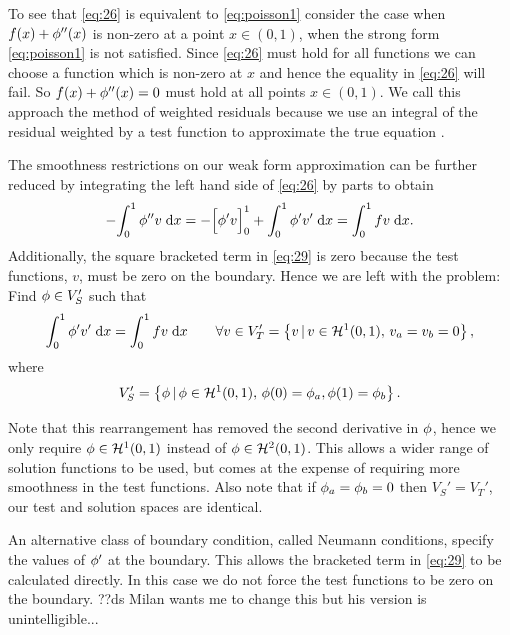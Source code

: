 To see that \cref{eq:26} is equivalent to \cref{eq:poisson1} consider the case when $f(x) + \phi''(x)$ is non-zero at a point $x \in (0,1)$, \ie when the strong form \cref{eq:poisson1} is not satisfied. 
Since \cref{eq:26} must hold for all functions we can choose a function which is non-zero at $x$ and hence the equality in \cref{eq:26} will fail.
So $f(x) + \phi''(x) = 0$ must hold at all points $x \in (0,1)$.
We call this approach the method of weighted residuals because we use an integral of the residual weighted by a test function to approximate the true equation \cite[210, 214]{Zeinkiewicz1967}.

The smoothness restrictions on our weak form approximation can be further reduced by integrating the left hand side of \cref{eq:26} by parts to obtain
\begin{equation}
  -{\int_0^1  \phi''v  {\; \mathrm{{d}}}{x}} = -\Big[ \phi'v \Big]_{0}^{1} + {\int_0^1  \phi'v'  {\; \mathrm{{d}}}{x}} = {\int_0^1 f v {\; \mathrm{{d}}}{x}}.
  \label{eq:29}
\end{equation}
Additionally, the square bracketed term in \cref{eq:29} is zero because the test functions, $v$, must be zero on the boundary.
Hence we are left with the problem: Find $\phi \in V'_{S}$ such that
\begin{equation}
  {\int_0^1  \phi'v'  {\; \mathrm{{d}}}{x}} = {\int_0^1  fv  {\; \mathrm{{d}}}{x}} \qquad 
  \forall v \in V'_{T} = \left\{ {v \,|\, v \in \mathcal{H}^1(0,1),\, v_a=v_b=0} \right\},
  \label{eq:symmetric-weak-poisson}
\end{equation}
where
\begin{equation}
  V_{S}'=\left\{ {\phi \,|\, \phi \in \mathcal{H}^1(0,1),\, \phi(0) = \phi_a, \phi(1) = \phi_b } \right\}.
\end{equation}

Note that this rearrangement has removed the second derivative in $\phi$, hence we only require $\phi \in \mathcal{H}^1(0,1)$ instead of $\phi \in \mathcal{H}^2(0,1)$.
This allows a wider range of solution functions to be used, but comes at the expense of requiring more smoothness in the test functions.
Also note that if $\phi_a = \phi_b = 0$ then $V_{S}'=V_{T}'$, our test and solution spaces are identical.

An alternative class of boundary condition, called Neumann conditions, specify the values of $\phi'$ at the boundary.
This allows the bracketed term in \cref{eq:29} to be calculated directly.
In this case we do not force the test functions to be zero on the boundary.
??ds Milan wants me to change this but his version is unintelligible...

